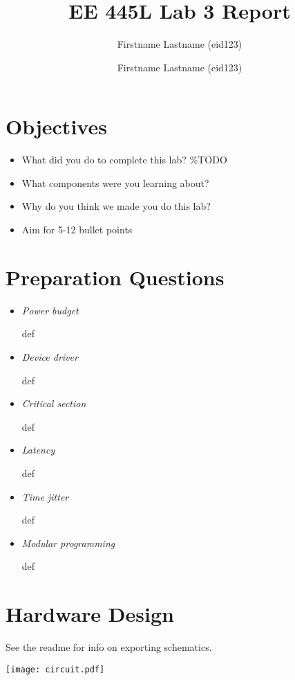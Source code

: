 \documentclass{article}
\title{EE 445L Lab 3 Report}
\author{Firstname Lastname (eid123) \and Firstname Lastname (eid123)} \%TODO Replace everything in this field and the content between the [square brackets] with the appropriate information
\begin{document}
\maketitle

\section{Objectives}
\begin{itemize}
	\item What did you do to complete this lab? \%TODO
	\item What components were you learning about?
	\item Why do you think we made you do this lab?
	\item Aim for 5-12 bullet points
\end{itemize}

\section{Preparation Questions}

\begin{itemize}
	\item \emph{Power budget}

		def

	\item \emph{Device driver}

		def

	\item \emph{Critical section}

		def

	\item \emph{Latency}

		def

	\item \emph{Time jitter}

		def

	\item \emph{Modular programming}

		def

\end{itemize}

\section{Hardware Design}

	See the readme for info on exporting schematics.

	\texttt{[image: circuit.pdf]}
\end{document}

